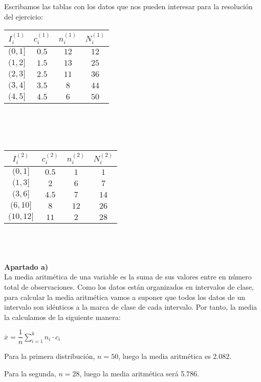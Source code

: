Escribamos las tablas con los datos que nos pueden interesar para la resolución del ejercicio: \\

\begin{tabular}{| c | c | c | c |}
	\hline
	$I_i^{(1)}$ & $c_i^{(1)}$ & $n_i^{(1)}$ & $N_i^{(1)}$ \\ \hline
	$(0, 1]$ & $0.5$ & $12$ & $12$ \\
	$(1, 2]$ & $1.5$ & $13$ & $25$ \\
	$(2, 3]$ & $2.5$ & $11$ & $36$ \\
	$(3, 4]$ & $3.5$ & $8$ & $44$ \\
	$(4, 5]$ & $4.5$ & $6$ & $50$ \\ \hline
	
\end{tabular} \\\\\\

\begin{tabular}{| c | c | c | c |}
	\hline
	$I_i^{(2)}$ & $c_i^{(2)}$ & $n_i^{(2)}$ & $N_i^{(2)}$ \\ \hline
	$(0, 1]$ & $0.5$ & $1$ & $1$ \\
	$(1, 3]$ & $2$ & $6$ & $7$ \\
	$(3, 6]$ & $4.5$ & $7$ & $14$ \\
	$(6, 10]$ & $8$ & $12$ & $26$ \\
	$(10, 12]$ & $11$ & $2$ & $28$ \\ \hline
	
\end{tabular}\\
\\ 
\\
\textbf{Apartado a)}\\

La media aritmética de una variable es la suma de sus valores entre en número total de observaciones. Como los datos están organizados en intervalos de clase, para calcular la media aritmética vamos a suponer que todos los datos de un intervalo son idénticos a la marca de clase de cada intervalo. Por tanto, la media la calculamos de la siguiente manera: 
\begin{center}
	$\overline{x} = \dfrac{1}{n}\sum_{i=1}^{k}n_i·c_i$
\end{center}

Para la primera distribución, $n = 50$, luego la media aritmética es 2.082. 

Para la segunda, $n = 28$, luego la media aritmética será 5.786. \\


